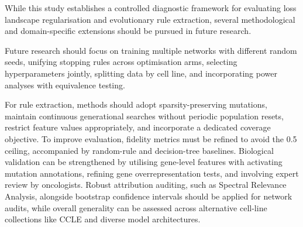 \label{sec:future-work}

While this study establishes a controlled diagnostic framework for evaluating loss landscape regularisation and evolutionary rule extraction, several methodological and domain-specific extensions should be pursued in future research.

Future research should focus on training multiple networks with different random seeds, unifying stopping rules across optimisation arms, selecting hyperparameters jointly, splitting data by cell line, and incorporating power analyses with equivalence testing.

For rule extraction, methods should adopt sparsity-preserving mutations, maintain continuous generational searches without periodic population resets, restrict feature values appropriately, and incorporate a dedicated coverage objective. To improve evaluation, fidelity metrics must be refined to avoid the 0.5 ceiling, accompanied by random-rule and decision-tree baselines. Biological validation can be strengthened by utilising gene-level features with activating mutation annotations, refining gene overrepresentation tests, and involving expert review by oncologists. Robust attribution auditing, such as Spectral Relevance Analysis, alongside bootstrap confidence intervals should be applied for network audits, while overall generality can be assessed across alternative cell-line collections like CCLE and diverse model architectures.